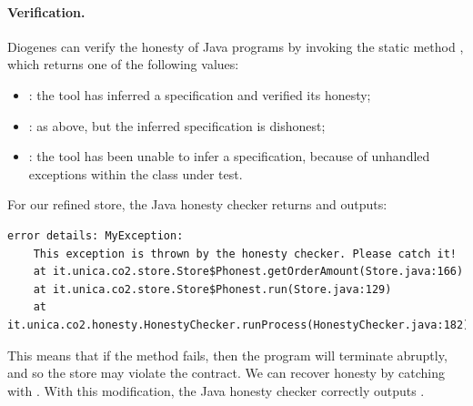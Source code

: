 \paragraph{Verification.}
Diogenes can verify the honesty of Java programs 
by invoking the static method
,
which returns one of the following values:
\begin{itemize}[noitemsep,topsep=0pt]
\item {}: the tool has inferred a \coco specification and verified its honesty;
\item {}: as above, but the inferred \coco specification is dishonest;
\item {}: the tool has been unable to infer a \coco specification,
  \eg because of unhandled exceptions within the class under test.
\end{itemize}

\noindent
For our refined store, the Java honesty checker returns  and outputs:
\begin{mdframed}
  \begin{verbatim}
error details: MyException: 
    This exception is thrown by the honesty checker. Please catch it!
    at it.unica.co2.store.Store$Phonest.getOrderAmount(Store.java:166)
    at it.unica.co2.store.Store$Phonest.run(Store.java:129)
    at it.unica.co2.honesty.HonestyChecker.runProcess(HonestyChecker.java:182)
  \end{verbatim}
\end{mdframed}
This means that if the method  fails,
then the program will terminate abruptly, 
and so the store may violate the contract.
We can recover honesty by catching  with .
With this modification, the Java honesty checker correctly outputs .

